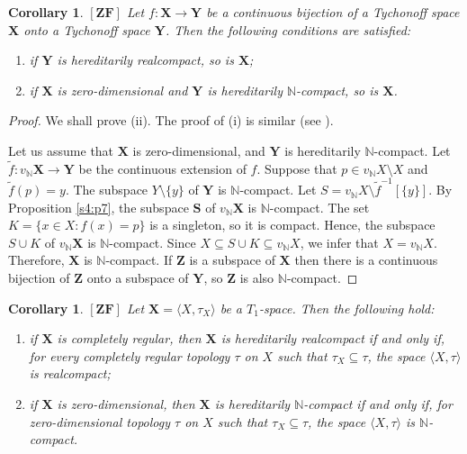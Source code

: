 \documentclass[12pt,twoside,leqno]{article}
\theoremstyle{plain}
\newtheorem{corollary}[theorem]{Corollary}
\theoremstyle{definition}
\theoremstyle{remark}
\begin{document}
\begin{corollary}
	\label{s6:c20}
	$[\mathbf{ZF}]$ 
	Let $f: \mathbf{X}\to\mathbf{Y}$ be a continuous bijection of a Tychonoff space $\mathbf{X}$ onto a Tychonoff space $\mathbf{Y}$. Then the following conditions are satisfied:
	\begin{enumerate}
		\item[(i)] if $\mathbf{Y}$ is hereditarily realcompact, so is $\mathbf{X}$;
		\item[(ii)] if $\mathbf{X}$ is zero-dimensional and $\mathbf{Y}$ is hereditarily $\mathbb{N}$-compact, so is $\mathbf{X}$.
	\end{enumerate}
\end{corollary}
\begin{proof}
	We shall prove (ii). The proof of (i) is similar (see \cite[the proof of Fact 24]{nik}).
	
	Let us assume that $\mathbf{X}$ is zero-dimensional, and $\mathbf{Y}$ is hereditarily $\mathbb{N}$-compact.  Let $\tilde{f}: v_{\mathbb{N}}\mathbf{X}\to\mathbf{Y}$ be the continuous extension of $f$. Suppose that $p\in v_{\mathbb{N}}X\setminus X$ and $\tilde{f}(p)=y$. The subspace $Y\setminus\{y\}$ of $\mathbf{Y}$  is $\mathbb{N}$-compact. Let $S=v_{\mathbb{N}}X\setminus \tilde{f}^{-1}[\{y\}]$. By Proposition \ref{s4:p7}, the subspace $\mathbf{S}$ of $v_{\mathbb{N}}\mathbf{X}$ is $\mathbb{N}$-compact. The set $K=\{x\in X: f(x)=p\}$ is a singleton, so it is compact. Hence, the subspace $S\cup K$ of $v_{\mathbb{N}}\mathbf{X}$ is $\mathbb{N}$-compact. Since $X\subseteq S\cup K\subseteq v_{\mathbb{N}}X$, we infer that $X=v_{\mathbb{N}}X$. Therefore, $\mathbf{X}$ is $\mathbb{N}$-compact. If $\mathbf{Z}$ is a subspace of $\mathbf{X}$ then there is a continuous bijection of $\mathbf{Z}$ onto a subspace of $\mathbf{Y}$, so $\mathbf{Z}$ is also $\mathbb{N}$-compact.
\end{proof}

\begin{corollary}
	\label{s6:c21}
	$[\mathbf{ZF}]$ Let $\mathbf{X}=\langle X, \tau_X\rangle$ be a $T_1$-space. Then the following hold:
	
	\begin{enumerate}
		\item[(i)] if $\mathbf{X}$ is completely regular, then $\mathbf{X}$ is hereditarily realcompact if and only if, for every completely regular topology $\tau$ on $X$ such that $\tau_X\subseteq \tau$, the space $\langle X, \tau\rangle$  is realcompact;
		\item[(ii)] if $\mathbf{X}$ is zero-dimensional, then  $\mathbf{X}$ is hereditarily $\mathbb{N}$-compact if and only if, for zero-dimensional topology $\tau$ on $X$ such that $\tau_X\subseteq \tau$, the space $\langle X, \tau\rangle$  is $\mathbb{N}$-compact.
	\end{enumerate}
\end{corollary}
\end{document}
